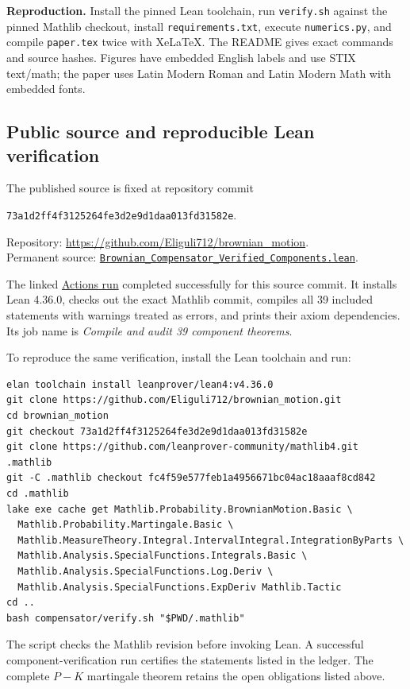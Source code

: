 \documentclass[11pt,letterpaper]{article}
\begin{document}
\textbf{Reproduction.} Install the pinned Lean toolchain, run \texttt{verify.sh} against the pinned Mathlib checkout, install \texttt{requirements.txt}, execute \texttt{numerics.py}, and compile \texttt{paper.tex} twice with XeLaTeX. The README gives exact commands and source hashes. Figures have embedded English labels and use STIX text/math; the paper uses Latin Modern Roman and Latin Modern Math with embedded fonts.

\subsection*{Public source and reproducible Lean verification}
The published source is fixed at repository commit
\begin{center}\texttt{73a1d2ff4f3125264fe3d2e9d1daa013fd31582e}.\end{center}
Repository: \url{https://github.com/Eliguli712/brownian_motion}.\\
Permanent source: \href{https://github.com/Eliguli712/brownian_motion/blob/73a1d2ff4f3125264fe3d2e9d1daa013fd31582e/compensator/Brownian_Compensator_Verified_Components.lean}{\texttt{Brownian\_Compensator\_Verified\_Components.lean}}.

The linked \href{https://github.com/Eliguli712/brownian_motion/actions/runs/45158953034}{Actions run} completed successfully for this source commit. It installs Lean 4.36.0, checks out the exact Mathlib commit, compiles all 39 included statements with warnings treated as errors, and prints their axiom dependencies. Its job name is \emph{Compile and audit 39 component theorems}.

To reproduce the same verification, install the Lean toolchain and run:
\begin{small}
\begin{verbatim}
elan toolchain install leanprover/lean4:v4.36.0
git clone https://github.com/Eliguli712/brownian_motion.git
cd brownian_motion
git checkout 73a1d2ff4f3125264fe3d2e9d1daa013fd31582e
git clone https://github.com/leanprover-community/mathlib4.git .mathlib
git -C .mathlib checkout fc4f59e577feb1a4956671bc04ac18aaaf8cd842
cd .mathlib
lake exe cache get Mathlib.Probability.BrownianMotion.Basic \
  Mathlib.Probability.Martingale.Basic \
  Mathlib.MeasureTheory.Integral.IntervalIntegral.IntegrationByParts \
  Mathlib.Analysis.SpecialFunctions.Integrals.Basic \
  Mathlib.Analysis.SpecialFunctions.Log.Deriv \
  Mathlib.Analysis.SpecialFunctions.ExpDeriv Mathlib.Tactic
cd ..
bash compensator/verify.sh "$PWD/.mathlib"
\end{verbatim}
\end{small}
The script checks the Mathlib revision before invoking Lean. A successful component-verification run certifies the statements listed in the ledger. The complete $P-K$ martingale theorem retains the open obligations listed above.
\end{document}
